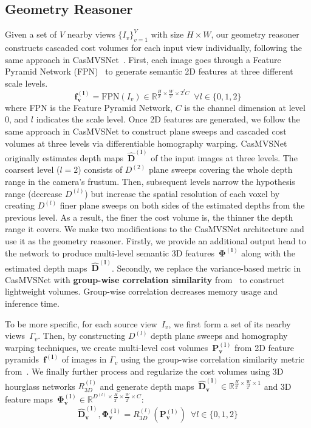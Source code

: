 \subsection{Geometry Reasoner} \label{sec:c3_geometry}
Given a set of $V$ nearby views $\{I_{v}\}_{v=1}^{V}$ with size $H \times W$, our geometry reasoner constructs cascaded cost volumes for each input view individually, following the same approach in CasMVSNet~\citep{gu2020cascade}. First, each image goes through a Feature Pyramid Network (FPN)~\citep{lin2017feature} to generate semantic 2D features at three different scale levels.
\begin{equation}
    \boldsymbol{f^{(l)}_{v}}=\text{FPN} \left( I_v \right) \in \mathbb{R}^{\frac{H}{2^l} \times \frac{W}{2^l} \times 2^lC} \phantom{0} \forall l \in \{0, 1, 2\}
\end{equation}
where FPN is the Feature Pyramid Network, $C$ is the channel dimension at level 0, and $l$ indicates the scale level. Once 2D features are generated, we follow the same approach in CasMVSNet to construct plane sweeps and cascaded cost volumes at three levels via differentiable homography warping. CasMVSNet originally estimates depth maps~$\boldsymbol{\hat{D}^{(l)}}$ of the input images at three levels. The coarsest level ($l=2$) consists of $D^{(2)}$ plane sweeps covering the whole depth range in the camera's frustum. Then, subsequent levels narrow the hypothesis range (decrease $D^{(l)}$) but increase the spatial resolution of each voxel by creating $D^{(l)}$ finer plane sweeps on both sides of the estimated depths from the previous level. As a result, the finer the cost volume is, the thinner the depth range it covers. We make two modifications to the CasMVSNet architecture and use it as the geometry reasoner. Firstly, we provide an additional output head to the network to produce multi-level semantic 3D features~$\boldsymbol{\Phi^{(l)}}$ along with the estimated depth maps~$\boldsymbol{\hat{D}^{(l)}}$. Secondly, we replace the variance-based metric in CasMVSNet with \textbf{group-wise correlation similarity} from~\cite{xu2020learning} to construct lightweight volumes. Group-wise correlation decreases memory usage and inference time.

To be more specific, for each source view~$I_{v}$, we first form a set of its nearby views~$\Gamma_{v}$. Then, by constructing $D^{(l)}$ depth plane sweeps and homography warping techniques, we create multi-level cost volumes~$\boldsymbol{P^{(l)}_{v}}$ from 2D feature pyramids~$\boldsymbol{f^{(l)}}$ of images in $\Gamma_{v}$ using the group-wise correlation similarity metric from~\cite{xu2020learning}. We finally further process and regularize the cost volumes using 3D hourglass networks $R^{(l)}_{3D}$ and generate depth maps~$\boldsymbol{\hat{D}^{(l)}_{v}} \in \mathbb{R}^{\frac{H}{2^l} \times \frac{W}{2^l} \times 1}$ and 3D feature maps~$\boldsymbol{\Phi^{(l)}_{v}} \in \mathbb{R}^{D^{(l)} \times \frac{H}{2^l} \times \frac{W}{2^l} \times C}$:
\begin{equation}
    \boldsymbol{\hat{D}^{(l)}_{v}}, \boldsymbol{\Phi^{(l)}_{v}}=R^{(l)}_{3D} \left( \boldsymbol{P^{(l)}_{v}} \right)  \phantom{0} \forall l \in \{0, 1, 2\}
\end{equation}

